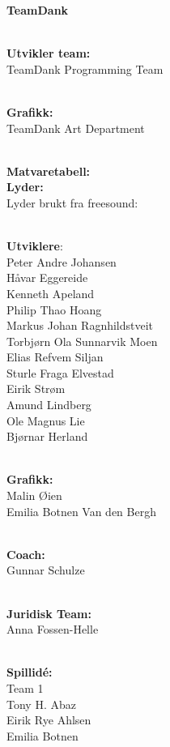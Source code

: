 \documentclass[paper=a4]{article}
\begin{document}
\begin{center} 
\textbf{TeamDank}\\ \

\textbf{Utvikler team:}\\
TeamDank Programming Team\\ \

\textbf{Grafikk:} \\
TeamDank Art Department \\ \

\textbf{Matvaretabell:} \\ 

\textbf{Lyder:} \\ 
Lyder brukt fra freesound: \\ \


\textbf{Utviklere}: \\
Peter Andre Johansen \\
Håvar Eggereide \\
Kenneth Apeland \\
Philip Thao Hoang \\
Markus Johan Ragnhildstveit \\
Torbjørn Ola Sunnarvik Moen \\
Elias Refvem Siljan \\
Sturle Fraga Elvestad \\
Eirik Strøm \\
Amund Lindberg \\
Ole Magnus Lie \\
Bjørnar Herland \\ \

\textbf{Grafikk:} \\
Malin Øien \\
Emilia Botnen Van den Bergh \\ \

\textbf{Coach:} \\
Gunnar Schulze \\ \ 

\textbf{Juridisk Team:} \\ 
Anna Fossen-Helle \\ \

\textbf{Spillidé:} \\
Team 1 \\
Tony H. Abaz \\
Eirik Rye Ahlsen \\
Emilia Botnen \\ \

\end{center}
\end{document}
